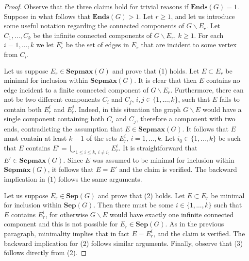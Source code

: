 \documentclass[10pt,A4]{amsart}
\theoremstyle{definition}
\theoremstyle{definition}
\newcommand{\sep}[1]{\mathbf{Sep}({#1})}
\newcommand{\Ends}[1]{\mathbf{Ends}({#1})}
\newcommand{\sepmax}[1]{\mathbf{Sepmax}({#1})}
\begin{document}
\begin{proof}
Observe that the three claims hold for trivial reasons if $\Ends{G}=1$. Suppose in what follows that $\Ends{G}>1$. Let $r\geq 1$, and let us introduce some useful notation regarding the connected components of $G\smallsetminus E_r$. Let  $C_1,\dots,C_k$ be the infinite connected components of $G\smallsetminus E_r$, $k\geq 1$. For each $i=1,\dots,k$ we let $E_r^i$ be the set of edges in $E_r$ that are incident to some vertex from $C_i$.  

Let us suppose $E_r\in\sepmax{G}$ and prove that (1) holds. Let $E\subset E_r$ be minimal for inclusion within $\sepmax{G}$. It is clear that then $E$ contains no edge incident to a finite connected component of $G\smallsetminus E_r$. Furthermore,  there can not be two different components $C_i$ and $C_j$, $i,j\in\{1,\dots,k\}$, such that $E$ fails to contain both $E_r^i$ and $E_r^j$. Indeed, in this situation the graph $G\smallsetminus E$ would have a single component containing both $C_i$ and $C_j$, therefore a component with two ends, contradicting the assumption that $E\in\sepmax{G}$. It follows that $E$ must contain at least $k-1$ of the sets $E_r^i$, $i=1,\dots,k$. Let $i_0\in\{1,\dots,k\}$ be such that $E$ contains $E'=\bigcup_{1\leq i\leq k,\ i\ne i_0}E_r^i$. It is straightforward that $E'\in\sepmax{G}$. Since $E$ was assumed to be minimal for inclusion within $\sepmax{G}$, it follows that $E=E'$ and the claim is verified. The backward implication in (1) follows the same arguments.  

Let us suppose $E_r\in\sep{G}$ and prove that (2) holds. Let $E\subset E_r$ be minimal for inclusion within $\sep{G}$. Then there must be some $i\in\{1,\dots,k\}$ such that $E$ contains $E_r^i$, for otherwise $G\smallsetminus E$ would have exactly one infinite connected component and this is not possible for $E_r\in\sep{G}$. As in the previous paragraph, minimality implies that in fact $E=E_r^i$, and the claim is verified. The backward implication for (2) follows similar arguments. Finally, observe that (3) follows directly from (2).\end{proof}
\end{document}
